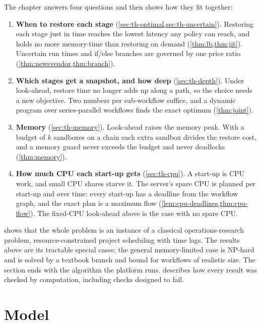 The chapter answers four questions and then shows how they fit together:
\begin{enumerate}
  \item \textbf{When to restore each stage} (\cref{sec:th-optimal,sec:th-uncertain}). Restoring
        each stage just in time reaches the lowest latency any policy can reach, and holds no
        more memory$\cdot$time than restoring on demand (\cref{thm:lb,thm:jit}). Uncertain
        run times and if/else branches are governed by one price ratio
        (\cref{thm:newsvendor,thm:branch}).
  \item \textbf{Which stages get a snapshot, and how deep} (\cref{sec:th-depth}). Under
        look-ahead, restore time no longer adds up along a path, so the choice needs a new
        objective. Two numbers per sub-workflow suffice, and a dynamic program over
        series-parallel workflows finds the exact optimum (\cref{thm:joint}).
  \item \textbf{Memory} (\cref{sec:th-memory}). Look-ahead raises the memory peak. With a budget
        of $k$ sandboxes on a chain each extra sandbox divides the restore cost, and a memory
        guard never exceeds the budget and never deadlocks (\cref{thm:memory}).
  \item \textbf{How much CPU each start-up gets} (\cref{sec:th-cpu}). A start-up is CPU work,
        and small CPU shares starve it. The server's spare CPU is planned per start-up and over
        time: every start-up has a deadline from the workflow graph, and the exact plan is a
        maximum flow (\cref{lem:cpu-deadlines,thm:cpu-flow}). The fixed-CPU look-ahead above is
        the case with no spare CPU.
\end{enumerate}
 shows that the whole problem is an instance of a classical
operations-research problem, resource-constrained project scheduling with time lags. The
results above are its tractable special cases; the general memory-limited case is NP-hard and
is solved by a textbook branch and bound for workflows of realistic size. The section ends with
the algorithm the platform runs.  describes how every result was
checked by computation, including checks designed to fail.

\section{Model}
\label{sec:th-model}

